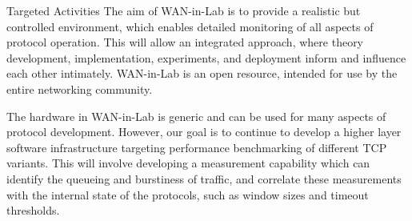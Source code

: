 \documentclass{IEEEtran}
\begin{document}
\begin{section}{Targeted Activities}
The aim of WAN-in-Lab is to provide a realistic but controlled
environment, which enables detailed monitoring of all aspects of
protocol operation. This will allow an integrated approach, where
theory development, implementation, experiments, and deployment inform
and influence each other intimately. WAN-in-Lab is an open resource,
intended for use by the entire networking community.

The hardware in WAN-in-Lab is generic and can be used for many aspects
of protocol development.  However, our goal is to continue to develop a
higher layer software infrastructure targeting performance benchmarking
of different TCP variants.  This will involve developing a measurement
capability which can identify the queueing and burstiness of traffic,
and correlate these measurements with the internal state of the protocols,
such as window sizes and timeout thresholds.

\end{section}
\end{document}

